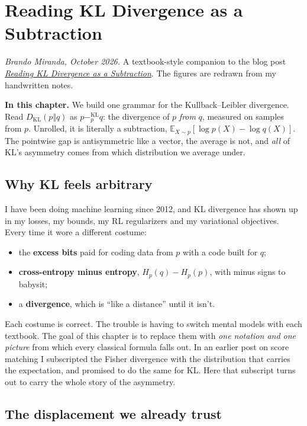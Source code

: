 \documentclass[11pt,oneside]{book}
\newcommand{\kl}[1]{\mathbin{-^{\mathrm{KL}}_{#1}}}       %
\newcommand{\DKL}{D_{\mathrm{KL}}}
\newcommand{\E}{\mathbb{E}}
\theoremstyle{definition}
\theoremstyle{plain}
\theoremstyle{remark}
\begin{document}
\chapter{Reading KL Divergence as a Subtraction}

\begin{tcolorbox}[notebox]
\small\textit{Brando Miranda, October 2026.} A textbook-style companion to the blog post
\href{https://cs.stanford.edu/people/brando9/2026/10/17/kl-divergence-as-a-subtraction.html}{\emph{Reading KL Divergence as a Subtraction}}.
The figures are redrawn from my handwritten notes.

\medskip
\textbf{In this chapter.} We build one grammar for the Kullback--Leibler divergence. Read
$\DKL(p\Vert q)$ as $p \kl{p} q$: the divergence of $p$ \emph{from} $q$, measured on samples from $p$.
Unrolled, it is literally a subtraction, $\E_{X\sim p}[\log p(X)-\log q(X)]$. The pointwise gap is
antisymmetric like a vector, the average is not, and \emph{all} of KL's asymmetry comes from which
distribution we average under.
\end{tcolorbox}

\section{Why KL feels arbitrary}

I have been doing machine learning since 2012, and KL divergence has shown up in my losses, my bounds,
my RL regularizers and my variational objectives. Every time it wore a different costume:
\begin{itemize}
  \item the \textbf{excess bits} paid for coding data from $p$ with a code built for $q$;
  \item \textbf{cross-entropy minus entropy}, $H_p(q)-H_p(p)$, with minus signs to babysit;
  \item a \textbf{divergence}, which is ``like a distance'' until it isn't.
\end{itemize}
Each costume is correct. The trouble is having to switch mental models with each textbook. The goal of
this chapter is to replace them with \emph{one notation and one picture} from which every classical formula
falls out. In an earlier post on score matching I subscripted the Fisher divergence with the distribution
that carries the expectation, and promised to do the same for KL. Here that subscript turns out to carry the
whole story of the asymmetry.

\section{The displacement we already trust}
\end{document}
